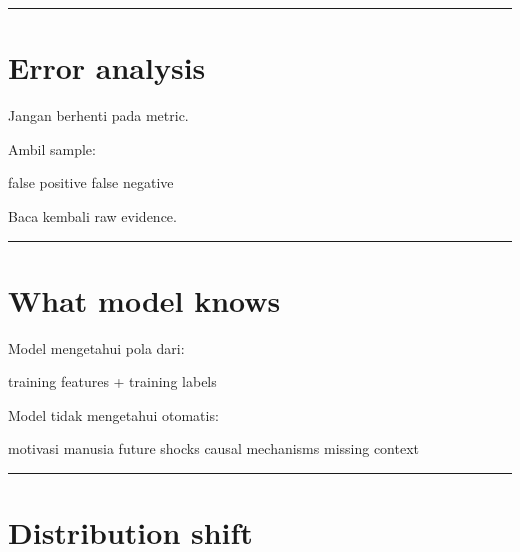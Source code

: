 \documentclass[
  indonesian,
  letterpaper,
  DIV=11,
  numbers=noendperiod]{scrreprt}
\newenvironment{Shaded}{\begin{snugshade}}{\end{snugshade}}
\newcommand{\NormalTok}[1]{\textcolor[rgb]{0.00,0.23,0.31}{#1}}
\begin{document}
\begin{center}\rule{0.5\linewidth}{0.5pt}\end{center}

\section{Error analysis}\label{error-analysis}

Jangan berhenti pada metric.

Ambil sample:

\begin{Shaded}
\begin{Highlighting}[]
\NormalTok{false positive}
\NormalTok{false negative}
\end{Highlighting}
\end{Shaded}

Baca kembali raw evidence.

\begin{center}\rule{0.5\linewidth}{0.5pt}\end{center}

\section{What model knows}\label{what-model-knows}

Model mengetahui pola dari:

\begin{Shaded}
\begin{Highlighting}[]
\NormalTok{training features + training labels}
\end{Highlighting}
\end{Shaded}

Model tidak mengetahui otomatis:

\begin{Shaded}
\begin{Highlighting}[]
\NormalTok{motivasi manusia}
\NormalTok{future shocks}
\NormalTok{causal mechanisms}
\NormalTok{missing context}
\end{Highlighting}
\end{Shaded}

\begin{center}\rule{0.5\linewidth}{0.5pt}\end{center}

\section{Distribution shift}\label{distribution-shift}
\end{document}
